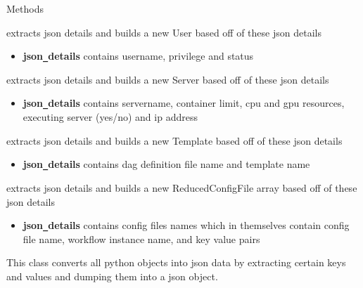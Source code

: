 \begin{methodenv}{Methods}

extracts json details and builds a new User based off of these json details
\begin{itemize}
        \item \textbf{json\texttt{\_}details}
        contains username, privilege and status
\end{itemize}

extracts json details and builds a new Server based off of these json details
\begin{itemize}
        \item \textbf{json\texttt{\_}details}
        contains servername, container limit, cpu and gpu resources, executing server (yes/no) and ip address
\end{itemize}

extracts json details and builds a new Template based off of these json details
\begin{itemize}
        \item \textbf{json\texttt{\_}details}
        contains dag definition file name and template name
\end{itemize}

extracts json details and builds a new ReducedConfigFile array based off of these json details
\begin{itemize}
        \item \textbf{json\texttt{\_}details}
        contains config files names which in themselves contain config file name, workflow instance name,
        and key value pairs
\end{itemize}

\end{methodenv}

This class converts all python objects into json data by extracting certain keys and values and dumping
them into a json object.

